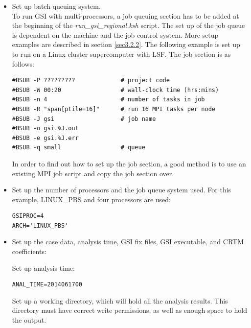 \begin{itemize}
\item Set up batch queuing system. \\
To run GSI with multi-processors, a job queuing section has to be added at the beginning of the \textit{run\_gsi\_regional.ksh} script.  The set up of the job queue is dependent on the machine and the job control system.  More setup examples are described in section \ref{sec3.2.2}. The following example is set up to run on a Linux cluster supercomputer with LSF. The job section is as follows:
 
\begin{scriptsize}
\begin{verbatim}
#BSUB -P ?????????             # project code
#BSUB -W 00:20                 # wall-clock time (hrs:mins)
#BSUB -n 4                     # number of tasks in job         
#BSUB -R "span[ptile=16]"      # run 16 MPI tasks per node
#BSUB -J gsi                   # job name
#BSUB -o gsi.%J.out         
#BSUB -e gsi.%J.err 
#BSUB -q small                 # queue
\end{verbatim}
\end{scriptsize}

In order to find out how to set up the job section, a good method is to use an existing MPI job script and copy the job section over. 
\\

\item Set up the number of processors and the job queue system used.  For this example, LINUX\_PBS and four processors are used:

\begin{scriptsize}
\begin{verbatim}
GSIPROC=4
ARCH='LINUX_PBS'
\end{verbatim}
\end{scriptsize}

\item Set up the case data, analysis time, GSI fix files, GSI executable, and CRTM coefficients:

Set up analysis time: 

\begin{scriptsize}
\begin{verbatim}
ANAL_TIME=2014061700
\end{verbatim}
\end{scriptsize}

Set up a working directory, which will hold all the analysis results.  This directory must have correct write permissions, as well as enough space to hold the output. 


\end{itemize}
